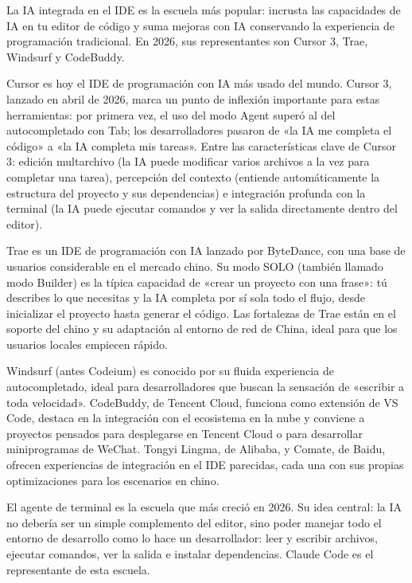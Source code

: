 
La IA integrada en el IDE es la escuela más popular: incrusta las capacidades de IA en tu editor de código y suma mejoras con IA conservando la experiencia de programación tradicional. En 2026, sus representantes son Cursor 3, Trae, Windsurf y CodeBuddy.


Cursor es hoy el IDE de programación con IA más usado del mundo. Cursor 3, lanzado en abril de 2026, marca un punto de inflexión importante para estas herramientas: por primera vez, el uso del modo Agent superó al del autocompletado con Tab; los desarrolladores pasaron de «la IA me completa el código» a «la IA completa mis tareas». Entre las características clave de Cursor 3: edición multarchivo (la IA puede modificar varios archivos a la vez para completar una tarea), percepción del contexto (entiende automáticamente la estructura del proyecto y sus dependencias) e integración profunda con la terminal (la IA puede ejecutar comandos y ver la salida directamente dentro del editor).


Trae es un IDE de programación con IA lanzado por ByteDance, con una base de usuarios considerable en el mercado chino. Su modo SOLO (también llamado modo Builder) es la típica capacidad de «crear un proyecto con una frase»: tú describes lo que necesitas y la IA completa por sí sola todo el flujo, desde inicializar el proyecto hasta generar el código. Las fortalezas de Trae están en el soporte del chino y su adaptación al entorno de red de China, ideal para que los usuarios locales empiecen rápido.


Windsurf (antes Codeium) es conocido por su fluida experiencia de autocompletado, ideal para desarrolladores que buscan la sensación de «escribir a toda velocidad». CodeBuddy, de Tencent Cloud, funciona como extensión de VS Code, destaca en la integración con el ecosistema en la nube y conviene a proyectos pensados para desplegarse en Tencent Cloud o para desarrollar miniprogramas de WeChat. Tongyi Lingma, de Alibaba, y Comate, de Baidu, ofrecen experiencias de integración en el IDE parecidas, cada una con sus propias optimizaciones para los escenarios en chino.


El agente de terminal es la escuela que más creció en 2026. Su idea central: la IA no debería ser un simple complemento del editor, sino poder manejar todo el entorno de desarrollo como lo hace un desarrollador: leer y escribir archivos, ejecutar comandos, ver la salida e instalar dependencias. Claude Code es el representante de esta escuela.

